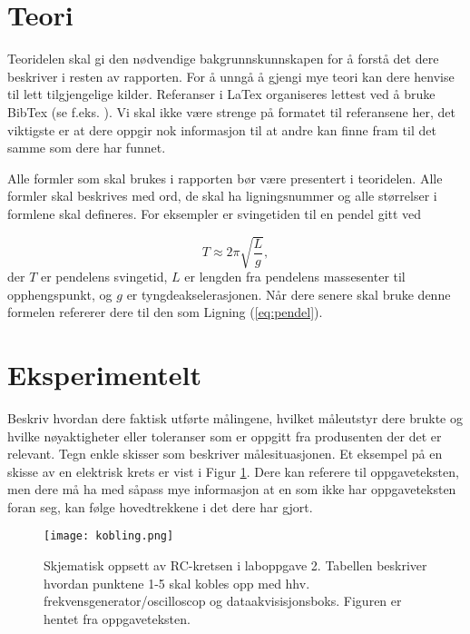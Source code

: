 \documentclass[norsk,a4paper,12pt]{article}
\begin{document}
\section{Teori}
Teoridelen skal gi den nødvendige bakgrunnskunnskapen for å forstå det dere beskriver i resten av rapporten. For å unngå å gjengi mye teori kan dere henvise til lett tilgjengelige kilder. Referanser i LaTex organiseres lettest ved å bruke BibTex (se f.eks. \cite{BibTex}). Vi skal ikke være strenge på formatet til referansene her, det viktigste er at dere oppgir nok informasjon til at andre kan finne fram til det samme som dere har funnet. 

Alle formler som skal brukes i rapporten bør være presentert i teoridelen. Alle formler skal beskrives med ord, de skal ha ligningsnummer og alle størrelser i formlene skal defineres. For eksempler er svingetiden til en pendel gitt ved 

\begin{equation}
T \approx 2\pi\sqrt{\frac{L}{g}},
\label{eq:pendel}
\end{equation}
der $T$ er pendelens svingetid, $L$ er lengden fra pendelens massesenter til opphengspunkt, og $g$ er tyngdeakselerasjonen. Når dere senere skal bruke denne formelen refererer dere til den som Ligning (\ref{eq:pendel}).


\section{Eksperimentelt}
Beskriv hvordan dere faktisk utførte målingene, hvilket måleutstyr
dere brukte og hvilke nøyaktigheter eller toleranser som er oppgitt
fra produsenten der det er relevant. Tegn enkle skisser som beskriver målesituasjonen. Et eksempel på en skisse av en elektrisk krets er vist i Figur \ref{fig:krets}. Dere kan referere til oppgaveteksten, men dere må ha med såpass mye informasjon at en som ikke har oppgaveteksten foran seg, kan følge hovedtrekkene i det dere har gjort.

\begin{figure}
\begin{center}
  \texttt{[image: kobling.png]}\\
  \caption{Skjematisk oppsett av RC-kretsen i laboppgave 2. Tabellen beskriver hvordan punktene 1-5 skal kobles opp med hhv. frekvensgenerator/oscilloscop og dataakvisisjonsboks. Figuren er hentet fra oppgaveteksten. }\label{fig:krets}
  \end{center}
\end{figure}
\end{document}
